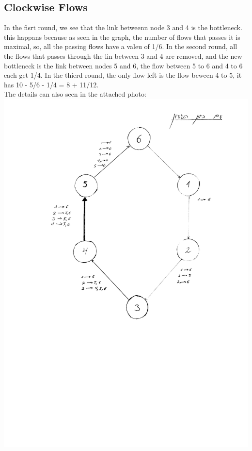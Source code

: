 \documentclass{article}
\begin{document}
\subsection{Clockwise Flows}
In the fisrt round, we see that the link betweenn node 3 and 4 is the bottleneck.
this happans because as seen in the graph, the number of flows that passes it is maximal,
so, all the passing flows have a valeu of 1/6.
In the second round, all the flows that passes through the lin between 3 and 4 are removed,
and the new bottleneck is the link between nodes 5 and 6, the flow  between 5 to 6 and 4 to 6 each get 1/4.
In the thierd round, the only flow left is the flow beween 4 to 5, it has 10 - 5/6 - 1/4 = 8 + 11/12.\\
The details can also seen in the attached photo:\\
\includegraphics[width=\textwidth]{i2.png}
\end{document}

